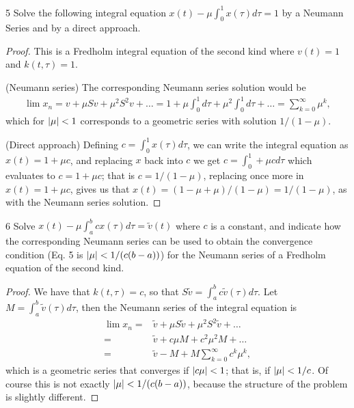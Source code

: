 \begin{exercise}{5}
Solve the following integral equation $x(t) - \mu \int_0^1 x(\tau) d\tau = 1$ by a Neumann Series and by a direct approach.
\end{exercise}
\begin{proof}
This is a Fredholm integral equation of the second kind where $v(t) = 1$ and $k(t, \tau) = 1$.

(Neumann series) 
The corresponding Neumann series solution would be 
\begin{align*}
    \lim x_n
    = v + \mu Sv + \mu^2 S^2 v + \dots
    = 1 + \mu \int_0^1 d\tau + \mu^2 \int_0^1 d\tau + \dots
    = \sum_{k=0}^\infty \mu^k,
\end{align*}
which for $\left\lvert \mu\right\rvert < 1$ corresponds to a geometric series with solution $1/(1-\mu)$.

(Direct approach)
Defining $c = \int_0^1 x(\tau) d\tau$, we can write the integral equation as $x(t) = 1 + \mu c$, and replacing $x$ back into $c$ we get $c = \int_0^1 + \mu c d\tau$ which evaluates to $c = 1 + \mu c$;
that is $c = 1/(1-\mu)$, replacing once more in $x(t) = 1 + \mu c$, gives us that $x(t) = (1 - \mu + \mu)/(1 - \mu) = 1/(1 - \mu)$, as with the Neumann series solution.
\end{proof} 

\begin{exercise}{6}
Solve $x(t) - \mu \int_a^b c x(\tau) d\tau = \tilde{v}(t)$ where $c$ is a constant, and indicate how the corresponding Neumann series can be used to obtain the convergence condition (Eq. 5 is $\left\lvert \mu\right\rvert < 1/(c(b-a))$) for the Neumann series of a Fredholm equation of the second kind.
\end{exercise}
\begin{proof}
We have that $k(t,\tau) = c$, so that $S \tilde{v} = \int_a^b c \tilde{v}(\tau) d\tau$.
Let $M = \int_a^b \tilde{v}(\tau) d\tau$, then the Neumann series of the integral equation is 
\begin{align*}
    \lim x_n
    =& \tilde{v} + \mu S \tilde{v} + \mu^2 S^2 \tilde{v} + \dots\\
    =& \tilde{v} + c \mu M + c^2 \mu^2 M + \dots\\
    =& \tilde{v} - M + M \sum_{k=0}^\infty c^k \mu^k,
\end{align*}
which is a geometric series that converges if $\left\lvert c \mu\right\rvert < 1$;
that is, if $\left\lvert \mu\right\rvert < 1/c$. 
Of course this is not exactly $\left\lvert \mu\right\rvert < 1/(c(b-a))$, because the structure of the problem is slightly different.
\end{proof} 

